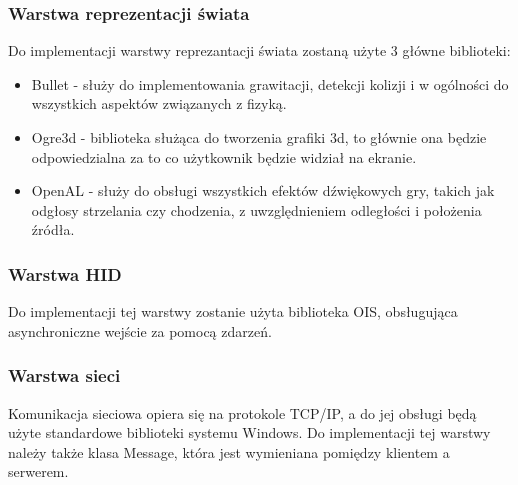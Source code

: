 \documentclass[12pt,a4paper,twoside]{article}
\begin{document}

\subsubsection{Warstwa reprezentacji świata}

Do implementacji warstwy reprezantacji świata zostaną użyte 3 główne biblioteki:

\begin{itemize}
\item Bullet - służy do implementowania grawitacji, detekcji kolizji i w ogólności do wszystkich aspektów związanych z fizyką.
\item Ogre3d - biblioteka służąca do tworzenia grafiki 3d, to głównie ona będzie odpowiedzialna za to co użytkownik będzie widział na ekranie.
\item OpenAL - służy do obsługi wszystkich efektów dźwiękowych gry, takich jak odgłosy strzelania czy chodzenia, z uwzględnieniem odległości i położenia źródła.
\end{itemize}

\subsubsection{Warstwa HID}

Do implementacji tej warstwy zostanie użyta biblioteka OIS, obsługująca asynchroniczne wejście za pomocą zdarzeń. 

\subsubsection{Warstwa sieci}

Komunikacja sieciowa opiera się na protokole TCP/IP, a do jej obsługi będą użyte standardowe biblioteki systemu Windows. Do implementacji tej warstwy należy także klasa Message, która jest wymieniana pomiędzy klientem a serwerem.


\end{document}
